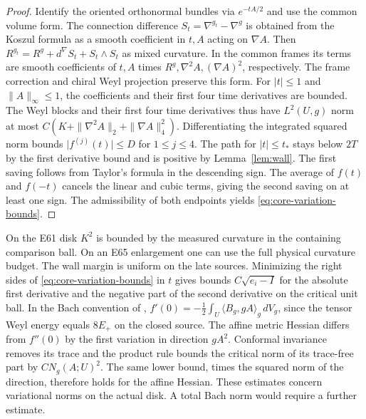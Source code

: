 \begin{proof}
Identify the oriented orthonormal bundles via \(e^{-tA/2}\) and use
the common volume form. The connection difference
\(S_t=\nabla^{g_t}-\nabla^g\) is obtained from the Koszul formula as
a smooth coefficient in \(t,A\) acting on \(\nabla A\).
Then \(R^{g_t}=R^g+d^\nabla S_t+S_t\wedge S_t\) as mixed curvature.
In the common frames its terms are smooth coefficients of
\(t,A\) times \(R^g,\nabla^2A,(\nabla A)^2\), respectively.
The frame correction and chiral Weyl projection preserve this form.
For \(|t|\le1\) and \(\|A\|_\infty\le1\), the coefficients and
their first four time derivatives are bounded. The Weyl blocks
and their first four time derivatives thus have \(L^2(U,g)\) norm
at most \(C(K+\|\nabla^2A\|_2+\|\nabla A\|_4^2)\).
Differentiating the integrated squared norm bounds
\(\lvert f^{(j)}(t)\rvert\le D\) for \(1\le j\le4\).
The path for \(|t|\le t_*\) stays below \(2T\) by the first
derivative bound and is positive by Lemma~\ref{lem:wall}.
The first saving follows from Taylor's formula in the descending
sign. The average of \(f(t)\) and \(f(-t)\) cancels the linear
and cubic terms, giving the second saving on at least one sign.
The admissibility of both endpoints yields
\eqref{eq:core-variation-bounds}.
\end{proof}

On the E61 disk \(K^2\) is bounded by the measured curvature in
the containing comparison ball. On an E65 enlargement one can use
the full physical curvature budget. The wall margin is uniform on
the late sources. Minimizing the right sides of
\eqref{eq:core-variation-bounds} in \(t\) gives bounds
\(C\sqrt{e_i-I}\) for the absolute first derivative and the negative
part of the second derivative on the critical unit ball.
In the Bach convention of \cite[\S1]{BahuaudGuentherIsenbergMazzeo2025Bach},
\(f'(0)=-\tfrac12\int_U\langle B_g,gA\rangle_g\,dV_g\), since
the tensor Weyl energy equals \(8E_+\) on the closed source.
The affine metric Hessian differs from \(f''(0)\) by the first
variation in direction \(gA^2\). Conformal invariance removes its
trace and the product rule bounds the critical norm of its
trace-free part by \(CN_g(A;U)^2\). The same lower bound, times
the squared norm of the direction, therefore holds for the
affine Hessian. These estimates concern variational norms on the
actual disk. A total Bach norm would require a further estimate.

